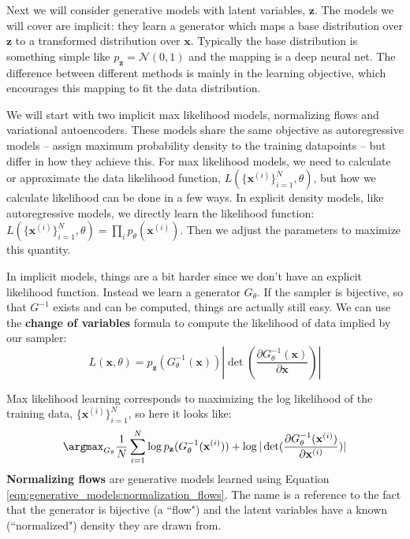 Next we will consider generative models with latent variables, $\mathbf{z}$. The models we will cover are implicit: they learn a generator which maps a base distribution over $\mathbf{z}$ to a transformed distribution over $\mathbf{x}$. Typically the base distribution is something simple like $p_{\mathbf{z}} = \mathcal{N}(0,1)$ and the mapping is a deep neural net. The difference between different methods is mainly in the learning objective, which encourages this mapping to fit the data distribution.

We will start with two implicit max likelihood models, normalizing flows and variational autoencoders. These models share the same objective as autoregressive models -- assign maximum probability density to the training datapoints -- but differ in how they achieve this. For max likelihood models, we need to calculate or approximate the data likelihood function, $L(\{\mathbf{x}^{(i)}\}_{i=1}^N, \theta)$, but how we calculate likelihood can be done in a few ways. In explicit density models, like autoregressive models, we directly learn the likelihood function: $L(\{\mathbf{x}^{(i)}\}_{i=1}^N, \theta) = \prod_i p_{\theta}(\mathbf{x}^{(i)})$. Then we adjust the parameters to maximize this quantity.

In implicit models, things are a bit harder since we don't have an explicit likelihood function. Instead we learn a generator $G_{\theta}$. If the sampler is bijective, so that $G^{-1}$ exists and can be computed, things are actually still easy. We can use the {\bf change of variables} formula to compute the likelihood of data implied by our sampler:
\begin{equation*}
    L(\mathbf{x}, \theta) = p_{\mathbf{z}}(G_{\theta}^{-1}(\mathbf{x}))|\det(\frac{\partial G_{\theta}^{-1}(\mathbf{x})}{\partial \mathbf{x}})| 
\end{equation*}

Max likelihood learning corresponds to maximizing the log likelihood of the training data, $\{\mathbf{x}^{(i)}\}_{i=1}^N$, so here it looks like:
\begin{equation}
    \argmax_{G_{\theta}} \frac{1}{N} \sum_{i=1}^N \log p_{\mathbf{z}}(G_{\theta}^{-1}(\mathbf{x}^{(i)})) + \log |\det(\frac{\partial G_{\theta}^{-1}(\mathbf{x}^{(i)})}{\partial \mathbf{x}^{(i)}})|\label{eqn:generative_models:normalization_flows}
\end{equation}
{\bf Normalizing flows} are generative models learned using Equation \ref{eqn:generative_models:normalization_flows}. The name is a reference to the fact that the generator is bijective (a ``flow") and the latent variables have a known (``normalized") density they are drawn from.


